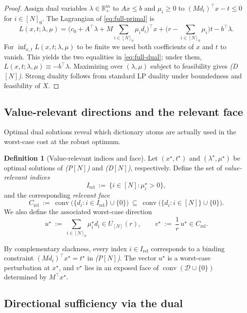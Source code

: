 \documentclass[accepted]{uai2026}
\theoremstyle{plain}
\theoremstyle{definition}
\newtheorem{definition}[theorem]{Definition}
\theoremstyle{remark}
\newcommand{\R}{\mathbb{R}}
\DeclareMathOperator{\conv}{conv}
\begin{document}
\begin{proof}
Assign dual variables $\lambda\in\R^m_+$ to $Ax\le b$ and
$\mu_i\ge 0$ to $(Md_i)^\top x - t \le 0$ for $i\in[N]_0$.
The Lagrangian of \eqref{eq:full-primal} is
\[
L(x,t;\lambda,\mu)
=\big(c_0 + A^\top\lambda + M\textstyle\sum_{i\in[N]_0}\mu_i d_i\big)^\top x
+\big(r-\sum_{i\in[N]_0}\mu_i\big)t - b^\top\lambda.
\]
For $\inf_{x,t} L(x,t;\lambda,\mu)$ to be finite we need both coefficients of
$x$ and $t$ to vanish. This yields the two equalities in
\eqref{eq:full-dual}; under them, $L(x,t;\lambda,\mu)\equiv -b^\top\lambda$.
Maximizing over $(\lambda,\mu)$ subject to feasibility gives \emph{(D$[N]$)}.
Strong duality follows from standard LP duality under boundedness and
feasibility of $X$.
\end{proof}

\subsection{Value-relevant directions and the relevant face}

Optimal dual solutions reveal which dictionary atoms are actually used in the
worst-case cost at the robust optimum.

\begin{definition}[Value-relevant indices and face]
Let $(x^\star,t^\star)$ and $(\lambda^\star,\mu^\star)$ be optimal solutions of
\emph{(P$[N]$)} and \emph{(D$[N]$)}, respectively. Define the set of
\emph{value-relevant indices}
\[
I_{\mathrm{rel}}\ :=\ \{i\in[N] : \mu_i^\star > 0\},
\]
and the corresponding \emph{relevant face}
\[
C_{\mathrm{rel}}\ :=\ \conv\!\big(\{d_i : i\in I_{\mathrm{rel}}\}\cup\{0\}\big)
\ \subseteq\ \conv\!\big(\{d_i : i\in[N]\}\cup\{0\}\big).
\]
We also define the associated worst-case direction
\[
u^\star\ :=\ \sum_{i\in[N]_0}\mu_i^\star d_i\in U_{[N]}(r),
\qquad
v^\star\ :=\ \frac{1}{r}\,u^\star\in C_{\mathrm{rel}}.
\]
\end{definition}

By complementary slackness, every index $i\in I_{\mathrm{rel}}$ corresponds to a
binding constraint $(Md_i)^\top x^\star=t^\star$ in \emph{(P$[N]$)}. The vector
$u^\star$ is a worst-case perturbation at $x^\star$, and $v^\star$ lies in an
exposed face of $\conv(\mathcal D\cup\{0\})$ determined by $M^\top x^\star$.

\subsection{Directional sufficiency via the dual}
\end{document}
